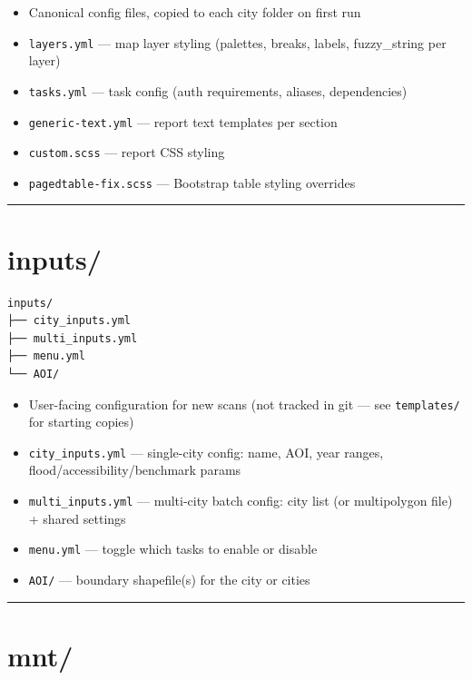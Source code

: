 \documentclass[
  letterpaper,
  DIV=11,
  numbers=noendperiod]{scrreprt}
\providecommand{\tightlist}{%
  \setlength{\itemsep}{0pt}\setlength{\parskip}{0pt}}
\begin{document}
\begin{itemize}
\tightlist
\item
  Canonical config files, copied to each city folder on first run
\item
  \texttt{layers.yml} --- map layer styling (palettes, breaks, labels,
  fuzzy\_string per layer)
\item
  \texttt{tasks.yml} --- task config (auth requirements, aliases,
  dependencies)
\item
  \texttt{generic-text.yml} --- report text templates per section
\item
  \texttt{custom.scss} --- report CSS styling
\item
  \texttt{pagedtable-fix.scss} --- Bootstrap table styling overrides
\end{itemize}

\begin{center}\rule{0.5\linewidth}{0.5pt}\end{center}

\section{inputs/}\label{inputs}

\begin{verbatim}
inputs/
├── city_inputs.yml
├── multi_inputs.yml
├── menu.yml
└── AOI/
\end{verbatim}

\begin{itemize}
\tightlist
\item
  User-facing configuration for new scans (not tracked in git --- see
  \texttt{templates/} for starting copies)
\item
  \texttt{city\_inputs.yml} --- single-city config: name, AOI, year
  ranges, flood/accessibility/benchmark params
\item
  \texttt{multi\_inputs.yml} --- multi-city batch config: city list (or
  multipolygon file) + shared settings
\item
  \texttt{menu.yml} --- toggle which tasks to enable or disable
\item
  \texttt{AOI/} --- boundary shapefile(s) for the city or cities
\end{itemize}

\begin{center}\rule{0.5\linewidth}{0.5pt}\end{center}

\section{mnt/}\label{mnt}
\end{document}
